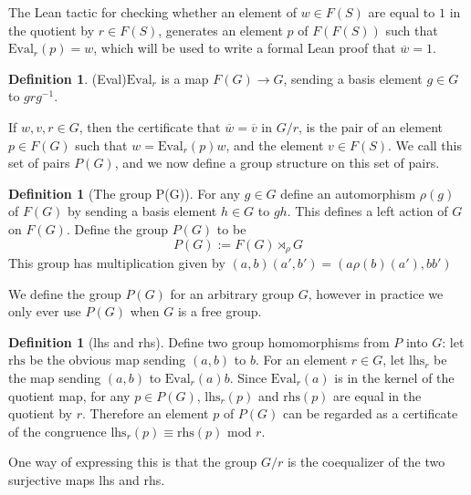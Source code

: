 \documentclass[12pt]{article} %
\theoremstyle{definition}
\theoremstyle{definition}
\theoremstyle{definition}
\theoremstyle{definition}
\theoremstyle{definition}
\newtheorem{defn}[theorem]{Definition}
\theoremstyle{definition}
\newtheorem{subdef}{Definition}[theorem]
\begin{document}
The Lean tactic
for checking whether an element of $w \in F(S)$ are equal to $1$ in the quotient by $r \in F(S)$,
generates an element $p$ of $F(F(S))$ such that $\text{Eval}_r(p) = w$, which will be used to write
a formal Lean proof that $\overline{w} = 1$.

\begin{defn}(Eval)\label{Eval}
  $\text{Eval}_r$ is a map $F(G) \to G$, sending a basis element $g \in G$ to $grg^{-1}$.
\end{defn}

If $w, v, r \in G$, then the certificate that $\overline{w} = \overline{v}$ in $G / r$,
is the pair of an element
$p \in F(G)$ such that $w = \text{Eval}_r(p) w$, and the element $v \in F(S)$.
We call this set of pairs $P(G)$, and we now define
a group structure on this set of pairs.

\begin{defn}[The group P(G)]
  For any $g \in G$ define an automorphism $\rho(g)$ of $F(G)$ by sending a basis
  element $h \in G$ to $gh$. This defines a left action of $G$ on $F(G)$.
  Define the group $P(G)$ to be
  \begin{equation}
  P(G) := F(G) \rtimes_{\rho} G
  \end{equation}
  This group has multiplication given by $(a, b) (a', b') = (a \rho(b)(a'), bb')$
\end{defn}

We define the group $P(G)$ for an arbitrary group $G$, however in practice we only
ever use $P(G)$ when $G$ is a free group.

\begin{subdef}[lhs and rhs]
Define two group homomorphisms from $P$ into $G$: let
$\text{rhs}$ be the obvious map sending $(a, b)$ to $b$.
For an element $r \in G$, let $\text{lhs}_r$ be the map sending
$(a,b)$ to $\text{Eval}_r(a)b$.
Since $\text{Eval}_r(a)$ is in the kernel of the quotient map,
for any $p\in P(G)$, $\text{lhs}_r(p)$ and $\text{rhs}(p)$ are equal in the quotient by $r$.
Therefore an element $p$ of $P(G)$ can be regarded as a certificate of the congruence
$\text{lhs}_r(p) \equiv \text{rhs}(p) \text{ mod } r$.
\end{subdef}

One way of expressing this is that the group $G / r$ is the coequalizer of
the two surjective maps lhs and rhs.

\end{document}
